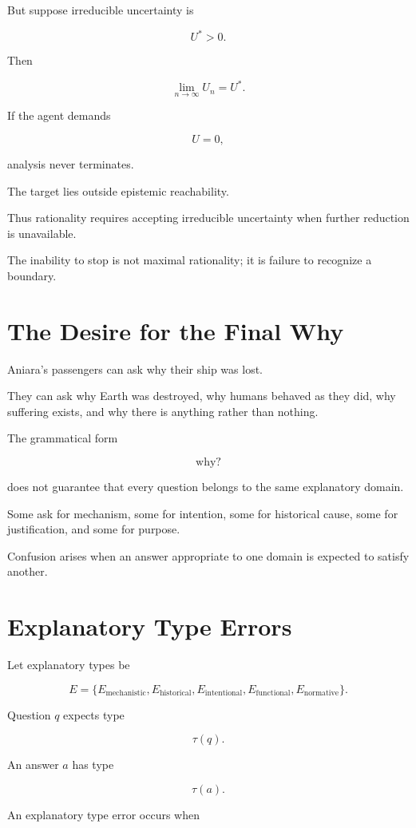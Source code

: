 \documentclass[11pt,oneside]{book}
\theoremstyle{definition}
\theoremstyle{remark}
\begin{document}
But suppose irreducible uncertainty is

\[
U^\ast>0.
\]

Then

\[
\lim_{n\rightarrow\infty}U_n
=
U^\ast.
\]

If the agent demands

\[
U=0,
\]

analysis never terminates.

The target lies outside epistemic reachability.

Thus rationality requires accepting irreducible uncertainty when further reduction is unavailable.

The inability to stop is not maximal rationality; it is failure to recognize a boundary.

\section{The Desire for the Final Why}

Aniara's passengers can ask why their ship was lost.

They can ask why Earth was destroyed, why humans behaved as they did, why suffering exists, and why there is anything rather than nothing.

The grammatical form

\[
\text{why?}
\]

does not guarantee that every question belongs to the same explanatory domain.

Some ask for mechanism, some for intention, some for historical cause, some for justification, and some for purpose.

Confusion arises when an answer appropriate to one domain is expected to satisfy another.

\section{Explanatory Type Errors}

Let explanatory types be

\[
E
=
\{
E_{\mathrm{mechanistic}},
E_{\mathrm{historical}},
E_{\mathrm{intentional}},
E_{\mathrm{functional}},
E_{\mathrm{normative}}
\}.
\]

Question \(q\) expects type

\[
\tau(q).
\]

An answer \(a\) has type

\[
\tau(a).
\]

An explanatory type error occurs when
\end{document}
